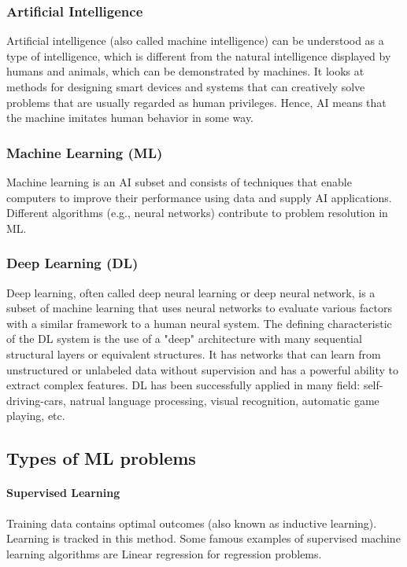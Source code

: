\subsubsection{Artificial Intelligence}
Artificial intelligence (also called machine intelligence) can be understood as a type of intelligence, which is different from the natural intelligence displayed by humans and animals, which can be demonstrated by machines. It looks at methods for designing smart devices and systems that can creatively solve problems that are usually regarded as human privileges. Hence, AI means that the machine imitates human behavior in some way. 
\subsubsection{Machine Learning (ML)} 
Machine learning is an AI subset and consists of techniques that enable computers to improve their performance using data and supply AI applications. Different algorithms (e.g., neural networks) contribute to problem resolution in ML.

\subsubsection{Deep Learning (DL)}
Deep learning, often called deep neural learning or deep neural network, is a subset of machine learning that uses neural networks to evaluate various factors with a similar framework to a human neural system. The defining characteristic of the DL system is the use of a "deep" architecture with many sequential structural layers or equivalent structures. It has networks that can learn from unstructured or unlabeled data without supervision and has a powerful ability to extract complex features. DL has been successfully applied in many field: self-driving-cars, natrual language processing, visual recognition, automatic game playing, etc.

\subsection{Types of ML problems}
\paragraph{Supervised Learning}
Training data contains optimal outcomes (also known as inductive learning). Learning is tracked in this method. Some famous examples of supervised machine learning algorithms are Linear regression for regression problems. 
